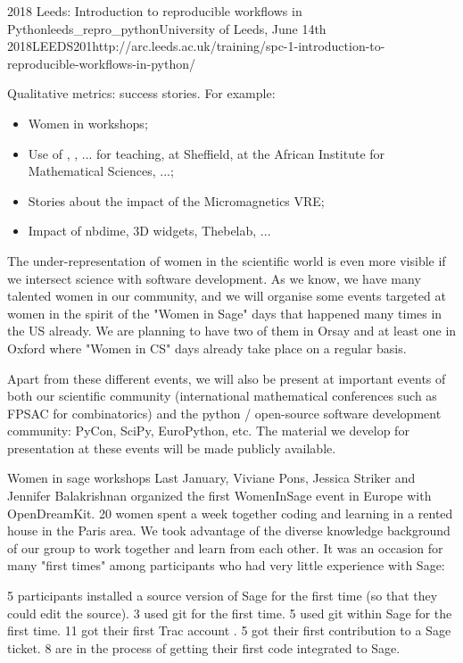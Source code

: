 \begin{Aim 1}
\begin{Aim 2}
\begin{event}{2018 Leeds: Introduction to reproducible workflows in Python}{leeds_repro_python}{University of Leeds, June 14th 2018}{LEEDS}{20}{1}{http://arc.leeds.ac.uk/training/spc-1-introduction-to-reproducible-workflows-in-python/}
\begin{itemize}
Qualitative metrics: success stories. For example:
\begin{itemize}
\item Women in \Sage workshops;
\item Use of \Jupyter, \cocalc, ... for teaching, at Sheffield, at the
  African Institute for Mathematical Sciences, ...;
\item Stories about the impact of the Micromagnetics VRE;
\item Impact of nbdime, 3D widgets, Thebelab, ...
\end{itemize}

 
 
 The under-representation of women in the scientific world is even
  more visible if we intersect science with software
  development. As we know, we have many talented women in our
  community, and we will organise some events targeted at women in the
  spirit of the "Women in Sage" days that happened many times in the
  US already. We are planning to have two of them in Orsay and at least
  one in Oxford where "Women in CS" days already take place on a regular basis.

  Apart from these different events, we will also be present at
  important events of both our scientific community (international
  mathematical conferences such as FPSAC for combinatorics) and the
  python / open-source software development community: PyCon, SciPy,
  EuroPython, etc. The material we develop for presentation at these
events will be made publicly available.
 
 Women in sage workshops
 Last January, Viviane Pons, Jessica Striker and Jennifer Balakrishnan organized the first WomenInSage event in Europe with OpenDreamKit. 20 women spent a week together coding and learning in a rented house in the Paris area.
We took advantage of the diverse knowledge background of our group to work together and learn from each other. It was an occasion for many "first times" among participants who had very little experience with Sage:

    5 participants installed a source version of Sage for the first time (so that they could edit the source).
    3 used git for the first time.
    5 used git within Sage for the first time.
    11 got their first Trac account .
    5 got their first contribution to a Sage ticket.
    8 are in the process of getting their first code integrated to Sage.


\end{itemize}
\end{event}
\end{Aim 2}
\end{Aim 1}
